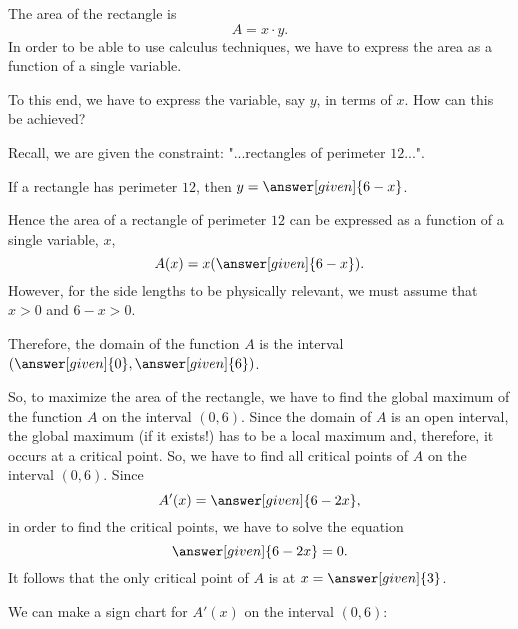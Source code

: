 \documentclass{ximera}
\begin{document}
\begin{example}
\begin{explanation}
  The area of the rectangle  is 
  \[
    A = x\cdot y.
    \]
   In order to be able to use  calculus techniques,  we have to express the area as a function of a single variable.
   
   To this end, we have to  express the variable, say $y$, in terms of $x$. How can this be achieved?
    
  Recall, we are given the constraint: "...rectangles of perimeter $12$...".
  
    If a rectangle has perimeter $12$, then
     $y=\answer[given]{6-x}$.
     
    Hence the area of a rectangle of perimeter $12$ can be expressed as a function of a single variable, $x$,
    \[
    A(x) = x(\answer[given]{6-x}).
    \]
    However, for the side lengths to be physically relevant, we must
    assume that $x>0$ and $6-x>0$.
    
     Therefore, the domain of  the function $A$ is  the interval
    $(\answer[given]{0},\answer[given]{6})$. 
      
    So, to maximize the area of the rectangle, we have to find the global maximum of the function $A$ on the interval $(0,6)$.
   Since the domain of $A$ is an open interval, the global maximum (if it exists!) has to be a local maximum and, therefore, it occurs at a critical point.
   So, we have to find all critical points of $A$ on the interval $(0,6)$.
    Since
    \[
    A'(x) = \answer[given]{6-2x},
    \]
   in order to find the critical points, we have to solve the equation
    \[
    \answer[given]{6-2x} = 0.
    \]
   It follows that the only critical point of $A$ is at $x=\answer[given]{3}$.
   
    We can make a sign chart for $A'(x)$ on the interval $(0,6)$:
    \begin{image}
\end{image}
\end{explanation}
\end{example}
\end{document}
